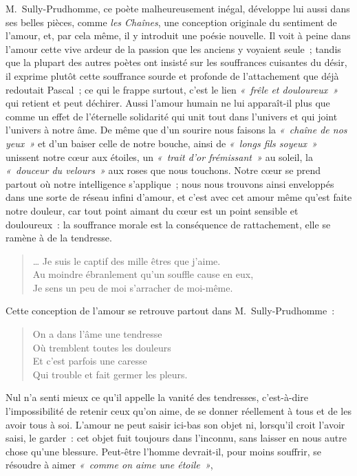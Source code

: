 \documentclass[french,twoside]{book} %
\begin{document}
M. Sully-Prudhomme, ce poète malheureusement inégal, développe lui aussi dans ses belles pièces, comme \emph{les Chaînes}, une conception originale du sentiment de l’amour, et, par cela même, il y introduit une poésie nouvelle. Il voit à peine dans l’amour cette vive ardeur de la passion que les anciens y voyaient seule ; tandis que la plupart des autres poètes ont insisté sur les souffrances cuisantes du désir, il exprime plutôt cette souffrance sourde et profonde de l’attachement que déjà redoutait Pascal ; ce qui le frappe surtout, c’est le lien \emph{« frêle et douloureux »} qui retient et peut déchirer. Aussi l’amour humain ne lui apparaît-il plus que comme un effet de l’éternelle solidarité qui unit tout dans l’univers et qui joint l’univers à notre âme. De même que d’un sourire nous faisons la \emph{« chaîne de nos yeux »} et d’un baiser celle de notre bouche, ainsi de \emph{« longs fils soyeux »} unissent notre cœur aux étoiles, un \emph{« trait d’or frémissant »} au soleil, la \emph{« douceur du velours »} aux roses que nous touchons. Notre cœur se prend partout où notre intelligence s’applique ; nous nous trouvons ainsi enveloppés dans une sorte de réseau infini d’amour, et c’est avec cet amour même qu’est faite notre douleur, car tout point aimant du cœur est un point sensible et douloureux : la souffrance morale est la  conséquence de rattachement, elle se ramène à de la tendresse.\par


\begin{verse}
… Je suis le captif des mille êtres que j’aime.\\
Au moindre ébranlement qu’un souffle cause en eux,\\
Je sens un peu de moi s’arracher de moi-même.\\
\end{verse}

\noindent Cette conception de l’amour se retrouve partout dans M. Sully-Prudhomme :\par


\begin{verse}
On a dans l’âme une tendresse\\
Où tremblent toutes les douleurs\\
Et c’est parfois une caresse\\
Qui trouble et fait germer les pleurs.\\
\end{verse}

\noindent Nul n’a senti mieux ce qu’il appelle la vanité des tendresses, c’est-à-dire l’impossibilité de retenir ceux qu’on aime, de se donner réellement à tous et de les avoir tous à soi. L’amour ne peut saisir ici-bas son objet ni, lorsqu’il croit l’avoir saisi, le garder : cet objet fuit toujours dans l’inconnu, sans laisser en nous autre chose qu’une blessure. Peut-être l’homme devrait-il, pour moins souffrir, se résoudre à aimer \emph{« comme on aime une étoile »},\par
\end{document}
